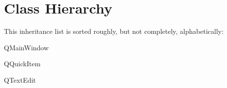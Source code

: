 \section{Class Hierarchy}
This inheritance list is sorted roughly, but not completely, alphabetically\+:\begin{DoxyCompactList}
\item {}
\item Q\+Main\+Window\begin{DoxyCompactList}
\item {}
\end{DoxyCompactList}
\item Q\+Quick\+Item\begin{DoxyCompactList}
\item {}
\end{DoxyCompactList}
\item Q\+Text\+Edit\begin{DoxyCompactList}
\item {}
\end{DoxyCompactList}
\end{DoxyCompactList}
